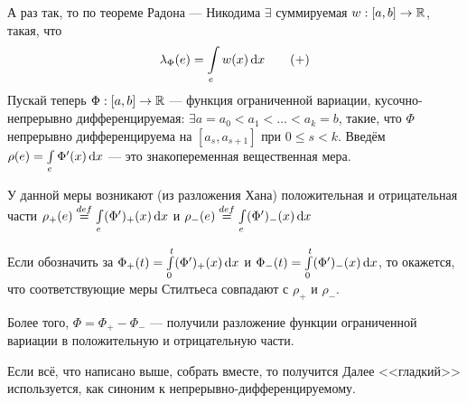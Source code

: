 \documentclass[a4paper]{report}
\begin{document}
    А раз так, то по теореме Радона --- Никодима $\exists$ суммируемая $w: [a, b] \rightarrow \mathbb{R}$, такая, что \[\lambda_\Phi(e) = \int\limits_{e}w(x)\operatorname{d}\! x\tag{$+$}\label{density}\]
    Пускай теперь $\Phi: [a, b] \rightarrow \mathbb{R}$ --- функция ограниченной вариации, кусочно-непрерывно дифференцируемая: $\exists a = a_0 < a_1 < \dots < a_k = b$, такие, что $\Phi$ непрерывно дифференцируема на $[a_s, a_{s+1}]$ при $0 \le s < k$.
    Введём $\rho(e) = \int\limits_{e}\Phi'(x)\operatorname{d}\! x$ --- это знакопеременная вещественная мера.

    У данной меры возникают (из разложения Хана) положительная и отрицательная части $\rho_+(e) \overset{def}{=} \int\limits_{e}(\Phi')_+(x)\operatorname{d}\! x$ и $\rho_-(e) \overset{def}{=} \int\limits_{e}(\Phi')_-(x)\operatorname{d}\! x$
    
    Если обозначить за $\Phi_+(t) = \int\limits_{0}^{t}(\Phi')_+(x)\operatorname{d}\! x$ и $\Phi_-(t) = \int\limits_{0}^{t}(\Phi')_-(x)\operatorname{d}\! x$, то окажется, что соответствующие меры Стилтьеса совпадают с $\rho_+$ и $\rho_-$.
    
    Более того, $\Phi = \Phi_+ - \Phi_-$ --- получили разложение функции ограниченной вариации в положительную и отрицательную части.
    
    Если всё, что написано выше, собрать вместе, то получится 
    Далее <<гладкий>> используется, как синоним к непрерывно-дифференцируемому.
\end{document}
